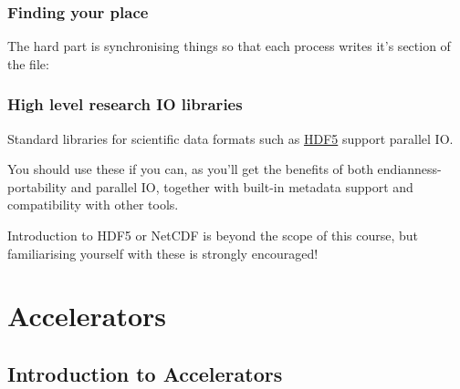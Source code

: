 \subsubsection{Finding your place}\label{finding-your-place}

The hard part is synchronising things so that each process writes it's
section of the file:

\begin{Shaded}
\begin{Highlighting}[]

   \NormalTok{*}\NormalTok{(}\NormalTok{) + }
             \NormalTok{(}\NormalTok{) + }
             \NormalTok{(}\NormalTok{); }

\end{Highlighting}
\end{Shaded}

\subsubsection{High level research IO
libraries}\label{high-level-research-io-libraries}

Standard libraries for scientific data formats such as
\href{http://www.hdfgroup.org/HDF5/}{HDF5} support parallel IO.

You should use these if you can, as you'll get the benefits of both
endianness-portability and parallel IO, together with built-in metadata
support and compatibility with other tools.

Introduction to HDF5 or NetCDF is beyond the scope of this course, but
familiarising yourself with these is strongly encouraged!

\section{Accelerators}\label{accelerators}

\subsection{Introduction to
Accelerators}\label{introduction-to-accelerators}


